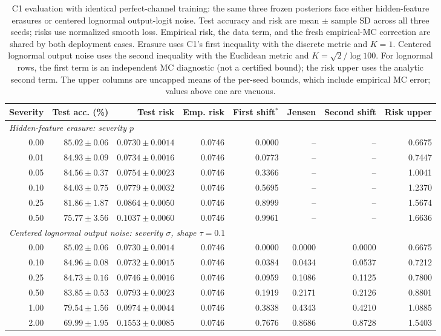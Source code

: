 \begin{table}[t]
\centering\footnotesize
\caption{C1 evaluation with identical perfect-channel training: the same three frozen posteriors face either hidden-feature erasures or centered lognormal output-logit noise. Test accuracy and risk are mean $\pm$ sample SD across all three seeds; risks use normalized smooth loss. Empirical risk, the data term, and the fresh empirical-MC correction are shared by both deployment cases. Erasure uses C1's first inequality with the discrete metric and $K=1$. Centered lognormal output noise uses the second inequality with the Euclidean metric and $K=\sqrt2/\log100$. For lognormal rows, the first term is an independent MC diagnostic (not a certified bound); the risk upper uses the analytic second term. The upper columns are uncapped means of the per-seed bounds, which include empirical MC error; values above one are vacuous.}
\label{tab:c1_evaluation}
\begin{tabular}{rrrrrrrr}
\toprule
Severity & Test acc. (\%) & Test risk & Emp. risk & First shift$^*$ & Jensen & Second shift & Risk upper\\
\midrule
\multicolumn{8}{l}{\emph{Hidden-feature erasure: severity $p$}}\\
0.00 & $85.02\pm0.06$ & $0.0730\pm0.0014$ & 0.0746 & 0.0000 & -- & -- & 0.6675\\
0.01 & $84.93\pm0.09$ & $0.0734\pm0.0016$ & 0.0746 & 0.0773 & -- & -- & 0.7447\\
0.05 & $84.56\pm0.37$ & $0.0754\pm0.0023$ & 0.0746 & 0.3366 & -- & -- & 1.0041\\
0.10 & $84.03\pm0.75$ & $0.0779\pm0.0032$ & 0.0746 & 0.5695 & -- & -- & 1.2370\\
0.25 & $81.86\pm1.87$ & $0.0864\pm0.0050$ & 0.0746 & 0.8999 & -- & -- & 1.5674\\
0.50 & $75.77\pm3.56$ & $0.1037\pm0.0060$ & 0.0746 & 0.9961 & -- & -- & 1.6636\\
\midrule
\multicolumn{8}{l}{\emph{Centered lognormal output noise: severity $\sigma$, shape $\tau=0.1$}}\\
0.00 & $85.02\pm0.06$ & $0.0730\pm0.0014$ & 0.0746 & 0.0000 & 0.0000 & 0.0000 & 0.6675\\
0.10 & $84.96\pm0.08$ & $0.0732\pm0.0015$ & 0.0746 & 0.0384 & 0.0434 & 0.0537 & 0.7212\\
0.25 & $84.73\pm0.16$ & $0.0746\pm0.0016$ & 0.0746 & 0.0959 & 0.1086 & 0.1125 & 0.7800\\
0.50 & $83.85\pm0.53$ & $0.0793\pm0.0023$ & 0.0746 & 0.1919 & 0.2171 & 0.2126 & 0.8801\\
1.00 & $79.54\pm1.56$ & $0.0974\pm0.0044$ & 0.0746 & 0.3838 & 0.4343 & 0.4210 & 1.0885\\
2.00 & $69.99\pm1.95$ & $0.1553\pm0.0085$ & 0.0746 & 0.7676 & 0.8686 & 0.8728 & 1.5403\\
\bottomrule
\end{tabular}
\end{table}
